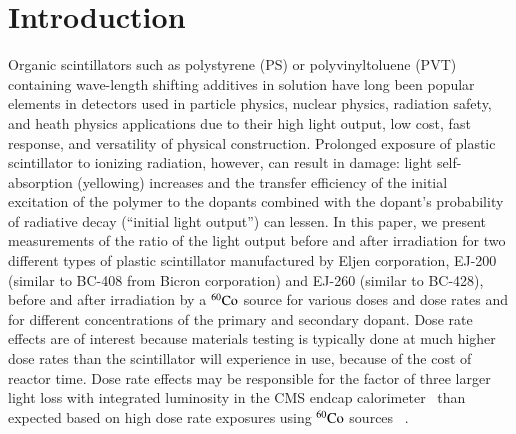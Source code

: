\documentclass[review]{elsarticle}
\begin{document}
\section{Introduction}
Organic scintillators such as polystyrene (PS) or polyvinyltoluene (PVT)
containing wave-length shifting
additives in solution have long been popular elements in detectors used
in particle physics, nuclear physics, radiation safety, and heath physics applications  due to their high light output, low cost, fast response,
and versatility of physical construction. 
Prolonged exposure of plastic scintillator to
ionizing radiation, however, can result in damage:
light self-absorption (yellowing) increases and
the transfer efficiency of the initial excitation of the polymer to the
dopants combined with the dopant's probability of radiative decay (``initial light output'') can lessen.  
In this paper, we present measurements of the ratio of the light output before and after irradiation
for two different types of plastic scintillator manufactured by Eljen corporation, EJ-200 (similar to BC-408 from Bicron corporation) and EJ-260 (similar to BC-428), before and after irradiation by a $\rm {^{60}Co}$ source for various doses and dose rates and for different concentrations of the primary and secondary dopant.
Dose rate effects are of interest because materials testing is typically done at much higher dose rates than the scintillator will experience in use, because of the cost of reactor time.
Dose rate effects may be responsible for the
factor of three larger light loss with integrated luminosity 
in the CMS endcap calorimeter~\cite{phaseiitdr,ecfa2015}
than expected based
on high dose rate exposures using ${\rm ^{60}Co}$ sources ~\cite{vasken,ByonWagner1993263}.
\end{document}
